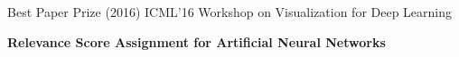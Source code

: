 \documentclass[10pt,a4paper]{article} %
\begin{document}
\vspace{5pt}
\inlineheadsection %
{Best Paper Prize (2016)}
{
    ICML'16 Workshop on Visualization for Deep Learning
}


\spacedhrule{1.6em}{-0.4em} %




\newcommand{\patentref}[5]{\href{#4}{#1 #2} ``#3'' (granted #5)}
\headedsection %
{\bf Relevance Score Assignment for Artificial Neural Networks}
\end{document}
